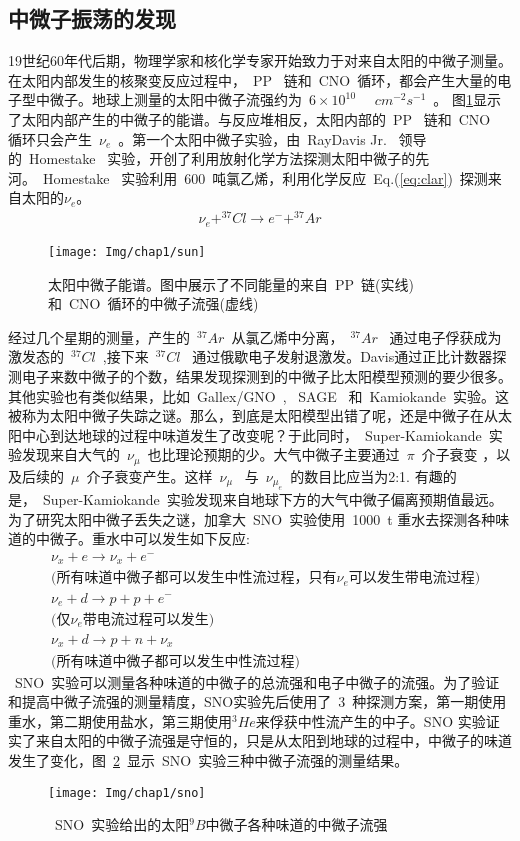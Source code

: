 \subsection{中微子振荡的发现}
19世纪60年代后期，物理学家和核化学专家开始致力于对来自太阳的中微子测量。在太阳内部发生的核聚变反应过程中，~PP~ 链和~CNO~循环，都会产生大量的电子型中微子。地球上测量的太阳中微子流强约为~$6\times 10^{10}$~ ~$cm^{-2}s^{-1}$~。 图\ref{fig:sun}显示了太阳内部产生的中微子的能谱。与反应堆相反，太阳内部的~PP~ 链和~CNO~ 循环只会产生~$\nu_e$~。第一个太阳中微子实验，由~RayDavis Jr. ~领导的~Homestake~ 实验，开创了利用放射化学方法探测太阳中微子的先河。~Homestake~ 实验利用~600~吨氯乙烯，利用化学反应~Eq.(\ref{eq:clar})~探测来自太阳的$\nu_e$。
\begin{eqnarray}\label{eq:clar}
\nu_e + ^{37}Cl \rightarrow e^- + ^{37}Ar
\end{eqnarray}
\begin{figure}[!htbp]
  \centering
   \texttt{[image: Img/chap1/sun]}
    \caption{太阳中微子能谱。图中展示了不同能量的来自~PP~链(实线)和~CNO~循环的中微子流强(虚线)}
  \label{fig:sun}
\end{figure}
经过几个星期的测量，产生的~$^{37}Ar$~从氯乙烯中分离，~$^{37}Ar$~ 通过电子俘获成为激发态的~$^{37}Cl$~,接下来~$^{37}Cl$ ~通过俄歇电子发射退激发。Davis通过正比计数器探测电子来数中微子的个数，结果发现探测到的中微子比太阳模型预测的要少很多。其他实验也有类似结果，比如~Gallex/GNO~, ~SAGE~ 和~Kamiokande~实验。这被称为太阳中微子失踪之谜。那么，到底是太阳模型出错了呢，还是中微子在从太阳中心到达地球的过程中味道发生了改变呢？于此同时，~Super-Kamiokande~实验发现来自大气的~$\nu_{\mu}$~也比理论预期的少。大气中微子主要通过~$\pi$~介子衰变 ，以及后续的~$\mu$~介子衰变产生。这样~$\nu_{\mu}$~ 与~$\nu_{\mu_e}$~的数目比应当为2:1. 有趣的是，~Super-Kamiokande~实验发现来自地球下方的大气中微子偏离预期值最远。为了研究太阳中微子丢失之谜，加拿大~SNO~实验使用~1000~t 重水去探测各种味道的中微子。重水中可以发生如下反应:
\begin{eqnarray}\label{eq:sno}
&\nu_x +e  \rightarrow \nu_x + e^- \\
& \text{(所有味道中微子都可以发生中性流过程，只有$\nu_e$可以发生带电流过程)} \nonumber \\
&\nu_e +d \rightarrow p + p + e^- \\
& \text{(仅$\nu_e$带电流过程可以发生)} \nonumber \\
&\nu_x +d  \rightarrow p + n + \nu_x \\
& \text{(所有味道中微子都可以发生中性流过程)} \nonumber
\end{eqnarray}
~SNO~实验可以测量各种味道的中微子的总流强和电子中微子的流强。为了验证和提高中微子流强的测量精度，SNO实验先后使用了~3~种探测方案，第一期使用重水，第二期使用盐水，第三期使用$^{3}He$来俘获中性流产生的中子。SNO 实验证实了来自太阳的中微子流强是守恒的，只是从太阳到地球的过程中，中微子的味道发生了变化，图~\ref{fig:sno}~显示~SNO~实验三种中微子流强的测量结果。
\begin{figure}[!htbp]
  \centering
   \texttt{[image: Img/chap1/sno]}
    \caption{ ~SNO~实验给出的太阳$^{9}B$中微子各种味道的中微子流强}
  \label{fig:sno}
\end{figure}
